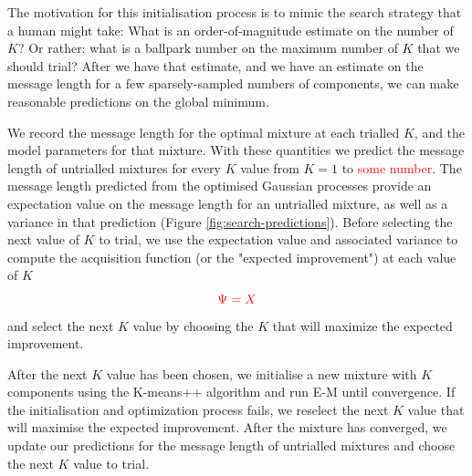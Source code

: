 \documentclass{elsarticle}
\newcommand{\todo}[1]{\textcolor{red}{#1}}
\begin{document}
The motivation for this initialisation process is to mimic the search strategy
that a human might take: What is an order-of-magnitude estimate on the number of
$K$? Or rather: what is a ballpark number on the maximum number of $K$ that we should
trial? After we have that estimate, and we have an estimate on the message length for a
few sparsely-sampled numbers of components, we can make reasonable predictions
on the global minimum.


We record the message length for the optimal mixture at each trialled $K$, and
the model parameters for that mixture. With these quantities we predict the
message length of untrialled mixtures for every $K$ value from $K = 1$ to 
\todo{some number}. The message length predicted from the optimised Gaussian processes
provide an expectation value on the message length for an untrialled mixture, as
well as a variance in that prediction (Figure \ref{fig:search-predictions}).
Before selecting the next value of $K$ to trial, we use the expectation value and
associated variance to compute the acquisition function\cite{Jones:1998} (or the "expected
improvement") at each value of $K$ 
\begin{equation}
	\todo{\Psi = X}
\end{equation}
\noindent{}and select the next $K$ value by choosing the $K$ that will maximize
the expected improvement.

After the next $K$ value has been chosen, we initialise a new mixture with $K$
components using the K-means++ algorithm\citep{kmeanspp} and run E-M until
convergence. If the initialisation and optimization process fails, we reselect
the next $K$ value that will maximise the expected improvement. After the mixture
has converged, we update our predictions for the message length of untrialled
mixtures and choose the next $K$ value to trial.
\end{document}
